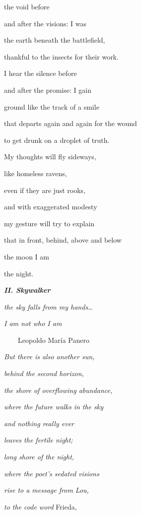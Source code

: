 \documentclass[a4paper]{article}
\begin{document}
the void before

and after the visions: I was

the earth beneath the battlefield,

thankful to the insects for their work.


\bigskip

I hear the silence before

and after the promise: I gain 

ground like the track of a smile

that departs again and again for the wound

to get drunk on a droplet of truth.


\bigskip

My thoughts will fly sideways, 

like homeless ravens,

even if they are just rooks,

and with exaggerated modesty

my gesture will try to explain

that in front, behind, above and below

the moon I am

the night.


\bigskip


\bigskip

{\bfseries\itshape
II. Skywalker}


\bigskip

{\itshape
the sky falls from my hands…}

{\itshape
I am not who I am}

\ \ \ \  Leopoldo María Panero


\bigskip


\bigskip

{\itshape
But there is also another sun,}

{\itshape
behind the second horizon,}

{\itshape
the shore of overflowing abundance, }

{\itshape
where the future walks in the sky}

{\itshape
and nothing really ever}

{\itshape
leaves the fertile night;}

{\itshape
long shore of the night,}

{\itshape
where the poet’s sedated visions }

{\itshape
rise to a message from Lou,}

\textit{to the code word }Frieda, 
\end{document}
